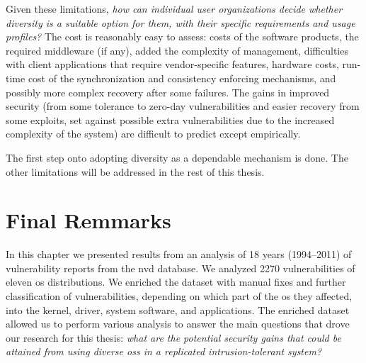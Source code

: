 Given these limitations, \emph{how can individual user organizations decide whether diversity is a suitable option for them, with their specific requirements and usage profiles?}
The cost is reasonably easy to assess: costs of the software products, the required middleware (if any), added the complexity of management, difficulties with client applications that require vendor-specific features, hardware costs, run-time cost of the synchronization and consistency enforcing mechanisms, and possibly more complex recovery after some failures.
The gains in improved security (from some tolerance to zero-day vulnerabilities and easier recovery from some exploits, set against possible extra vulnerabilities due to the increased complexity of the system) are difficult to predict except empirically. 


The first step onto adopting diversity as a dependable mechanism is done. 
The other limitations will be addressed in the rest of this thesis. 


\section{Final Remmarks}

In this chapter we presented results from an analysis of 18 years (1994--2011) of vulnerability reports from the \gls{nvd}  database. 
We analyzed 2270 vulnerabilities of eleven \gls{os} distributions. 
We enriched the dataset with manual fixes and further classification of vulnerabilities, depending on which part of the \gls{os} they affected, into the kernel, driver, system software, and applications. The enriched dataset allowed us to perform various analysis to answer the main questions that drove our research for this thesis: 
\emph{what are the potential security gains that could be attained from using diverse \glspl{os} in a replicated intrusion-tolerant system?}
 
